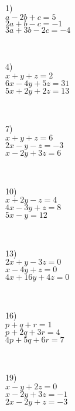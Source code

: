 {}
\label{matrices2}
\begin{multicols}{3}
  1)\\
	$a - 2 b + c = 5$\\
  $2 a + b - c = - 1$\\
  $3 a + 3 b - 2 c = - 4$\par
~\par
  4)\\
  $x + y + z = 2$\\
  $6 x - 4 y + 5 z = 31$\\
  $5 x + 2 y + 2 z = 13$\par
~\par
  7)\\
  $x + y + z = 6$\\
  $2 x - y - z = - 3$\\
  $x - 2 y + 3 z = 6$\par
~\par
  10)\\
  $x + 2 y - z = 4$\\
  $4 x - 3 y + z = 8$\\
  $5 x - y = 12$\par
~\par
  13)\\
  $2 x + y - 3 z = 0$\\
  $x - 4 y + z = 0$\\
  $4 x + 16 y + 4 z = 0$\par
~\par
  16)\\
  $p + q + r = 1$\\
  $p + 2 q + 3 r = 4$\\
  $4 p + 5 q + 6 r = 7$\par
~\par
  19)\\
  $x - y + 2 z = 0$\\
  $x - 2 y + 3 z = - 1$\\
  $2 x - 2 y + z = - 3$\par
~\par


\end{multicols}
